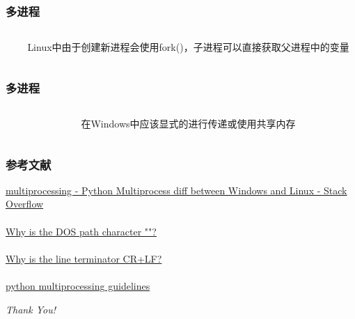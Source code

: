\documentclass[hyperref={pdfpagelabels=false}]{beamer}
\begin{document}
\begin{frame}
	\frametitle{多进程}
	\begin{columns}
		\begin{column}{.5\linewidth}
			
		\end{column}
	
		\begin{column}{.5\linewidth}
		Linux中由于创建新进程会使用fork()，子进程可以直接获取父进程中的变量
		\end{column}
	\end{columns}
\end{frame}

\begin{frame}
	\frametitle{多进程}
	\begin{columns}
		\begin{column}{.5\linewidth}
			
		\end{column}
	
		\begin{column}{.5\linewidth}
			在Windows中应该显式的进行传递或使用共享内存
		\end{column}
	\end{columns}
\end{frame}

\begin{frame}
	\frametitle{参考文献}
	\href{https://stackoverflow.com/questions/6596617/python-multiprocess-diff-between-windows-and-linux}{multiprocessing - Python Multiprocess diff between Windows and Linux - Stack Overflow}\\
	~\\
	\href{https://docs.microsoft.com/zh-cn/archive/blogs/larryosterman/why-is-the-dos-path-character}{Why is the DOS path character ""?}\\
	~\\
	\href{https://devblogs.microsoft.com/oldnewthing/20040318-00/?p=40193}{Why is the line terminator CR+LF?}\\
	~\\
	\href{https://docs.python.org/2/library/multiprocessing.html}{python multiprocessing guidelines}
\end{frame}

\begin{frame}{}
	\centering \Huge
	\emph{Thank You!}
\end{frame} 
\end{document}
